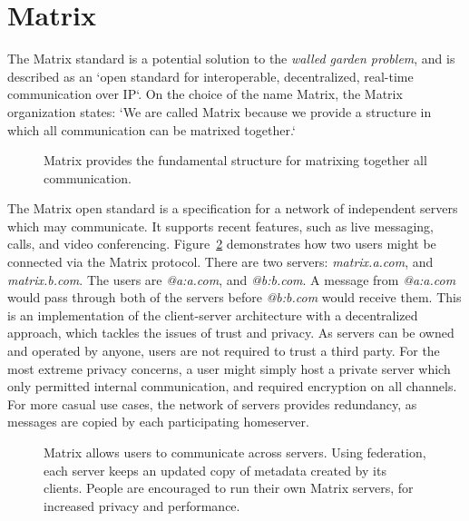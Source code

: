 \section{Matrix}
The Matrix standard is a potential solution to the \textit{walled garden problem}, and is described as an `open standard for interoperable, decentralized, real-time communication over IP`\cite{matrix_org}.
On the choice of the name Matrix, the Matrix organization states: `We are called Matrix because we provide a structure in which all communication can be matrixed together.`\cite{matrix_org_faq}

\begin{figure}
	\centering
	\caption{
		Matrix provides the fundamental structure for matrixing together all communication.
	}\label{fig:matrixing_together}
\end{figure}

The Matrix open standard\cite{matrix_org_spec} is a specification for a network of independent servers which may communicate.
It supports recent features, such as live messaging, calls, and video conferencing.
Figure~\ref{fig:matrix_structure} demonstrates how two users might be connected via the Matrix protocol.
There are two servers: \textit{matrix.a.com}, and \textit{matrix.b.com}.
The users are \textit{@a:a.com}, and \textit{@b:b.com}.
A message from \textit{@a:a.com} would pass through both of the servers before \textit{@b:b.com} would receive them.
This is an implementation of the client-server architecture with a decentralized approach, which tackles the issues of trust and privacy.
As servers can be owned and operated by anyone, users are not required to trust a third party.
For the most extreme privacy concerns, a user might simply host a private server which only permitted internal communication, and required encryption on all channels.
For more casual use cases, the network of servers provides redundancy, as messages are copied by each participating homeserver.

\begin{figure}
	\centering
	\resizebox{!}{!}{}
	\caption{
		Matrix allows users to communicate across servers.
		Using federation, each server keeps an updated copy of metadata created by its clients.
		People are encouraged to run their own Matrix servers, for increased privacy and performance.
	}\label{fig:matrix_structure}
\end{figure}


